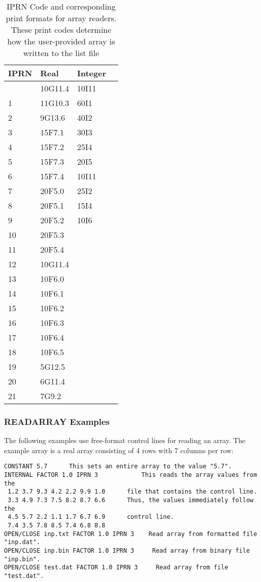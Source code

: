 \begin{longtable}{p{2cm} p{2cm} p{2cm} p{2cm}}
\caption{IPRN Code and corresponding print formats for array readers.  These print codes determine how the user-provided array is written to the list file} 
\tabularnewline
\hline
\hline
\textbf{IPRN} & \textbf{Real} & \textbf{Integer} \\
\hline
\endhead
\hline
\endfoot
0 & 10G11.4 & 10I11 \\
1 & 11G10.3 & 60I1 \\
2 & 9G13.6 & 40I2 \\
3 & 15F7.1 & 30I3 \\
4 & 15F7.2 & 25I4 \\
5 & 15F7.3 & 20I5 \\
6 & 15F7.4 & 10I11 \\
7 & 20F5.0 & 25I2 \\
8 & 20F5.1 & 15I4 \\
9 & 20F5.2 & 10I6 \\
10 & 20F5.3 &  \\
11 & 20F5.4 &  \\
12 & 10G11.4 & \\
13 & 10F6.0 &  \\
14 & 10F6.1 &  \\
15 & 10F6.2 &  \\
16 & 10F6.3 &  \\
17 & 10F6.4 &  \\
18 & 10F6.5 &  \\
19 & 5G12.5 &  \\
20 & 6G11.4 &  \\
21 & 7G9.2 &  \\
\end{longtable}


\subsubsection{READARRAY Examples}

The following examples use free-format control lines for reading an array. The example array is a real array consisting of 4 rows with 7 columns per row: 

\begin{lstlisting}[style=inputfile]
CONSTANT 5.7      This sets an entire array to the value "5.7". 
INTERNAL FACTOR 1.0 IPRN 3            This reads the array values from the 
 1.2 3.7 9.3 4.2 2.2 9.9 1.0      file that contains the control line. 
 3.3 4.9 7.3 7.5 8.2 8.7 6.6      Thus, the values immediately follow the 
 4.5 5.7 2.2 1.1 1.7 6.7 6.9      control line. 
 7.4 3.5 7.8 8.5 7.4 6.8 8.8 
OPEN/CLOSE inp.txt FACTOR 1.0 IPRN 3    Read array from formatted file "inp.dat". 
OPEN/CLOSE inp.bin FACTOR 1.0 IPRN 3     Read array from binary file "inp.bin". 
OPEN/CLOSE test.dat FACTOR 1.0 IPRN 3     Read array from file "test.dat". 
\end{lstlisting}


